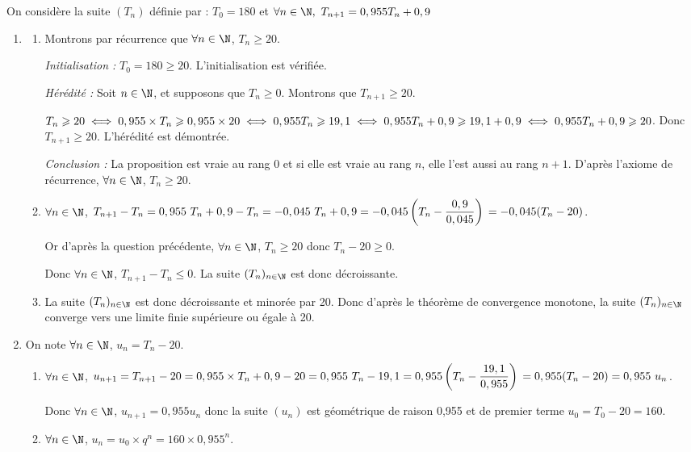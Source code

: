 
\bigskip

On considère la suite $\left(T_n\right)$ définie par : $T_0 = 180$ et $\forall n \in \N,~T_{n+1} = 0,955T_n + 0,9$

\begin{enumerate}
	\item 
	\begin{enumerate}
		\item Montrons par récurrence que $\forall n \in \N$, $T_n \geqslant20$.

		\textit{Initialisation :} $T_0=180\geqslant 20$. L'initialisation est vérifiée.

		\textit{Hérédité :} Soit  $n \in \N$, et supposons que $T_n \geqslant 0$. Montrons que $T_{n+1}\geqslant 20$.

$T_n \geqslant 20 \iff 0,955 \times T_n\geqslant 0,955\times 20\iff 0,955 T_n\geqslant 19,1 \\
		\iff 0,955 T_n + 0,9 \geqslant 19,1+0,9 \iff 0,955 T_n + 0,9 \geqslant 20$. Donc $T_{n+1}\geqslant 20$. L'hérédité est démontrée.

\textit{Conclusion : }  La proposition est vraie au rang $0$ et si elle est vraie au rang $n$, elle l'est aussi au rang $n + 1$.	D'après l'axiome de récurrence, $\forall n \in \N$, $T_n\geqslant 20$.
		\item $\forall n \in \N$, $T_{n+1}- T_n= 0,955~T_n+ 0,9 - T_n = - 0,045~T_n+0,9=-0,045\left(T_n-\dfrac{0,9}{0,045}\right)\\
	=-0,045(T_n-20)$.

Or d'après la question précédente, $\forall n \in \N$, $T_n\geqslant 20$ donc $T_n - 20 \geqslant 0$.

Donc $\forall n \in \N$, $T_{n+1}-T_n \leqslant0$. La suite $(T_n)_{n\in \N}$ est donc décroissante.
		\item La suite $(T_n)_{n\in \N}$ est donc décroissante et minorée par 20. Donc d'après le théorème de convergence monotone, la suite $(T_n)_{n\in \N}$ converge vers une limite finie supérieure ou égale à 20.
	\end{enumerate}
	\item On note $\forall n \in \N$, $u_n=T_n-20$.
	\begin{enumerate}
		\item $\forall n\in \N$, $u_{n+1}=T_{n+1}-20=0,955\times T_n+0,9-20=0,955~T_n-19,1=0,955\left(T_n-\dfrac{19,1}{0,955}\right)\\=0,955(T_n-20)=0,955~u_n$.

		Donc $\forall n\in \N$, $u_{n+1}=0,955u_n$ donc la suite $\left(u_n\right)$  est géométrique de raison 0,955 et de premier terme $u_0=T_0-20=160$.
		\item $\forall n\in \N$, $u_n=u_0 \times q^n=160 \times 0,955^n$.
	

\end{enumerate}
\end{enumerate}
